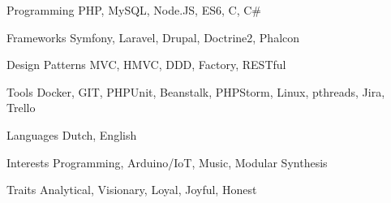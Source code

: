 

\begin{cvskills}

  \cvskill
    {Programming} %
    {PHP, MySQL, Node.JS, ES6, C, C\#} %

  \cvskill
    {Frameworks} %
    {Symfony, Laravel, Drupal, Doctrine2, Phalcon} %
    
  \cvskill
    {Design Patterns} %
    {MVC, HMVC, DDD, Factory, RESTful} %

  \cvskill
    {Tools} %
    {Docker, GIT, PHPUnit, Beanstalk, PHPStorm, Linux, pthreads, Jira, Trello} %

  \cvskill
    {Languages} %
    {Dutch, English} %

  \cvskill
    {Interests} %
    {Programming, Arduino/IoT, Music, Modular Synthesis} %

  \cvskill
    {Traits} %
    {Analytical, Visionary, Loyal, Joyful, Honest} %
\end{cvskills}
